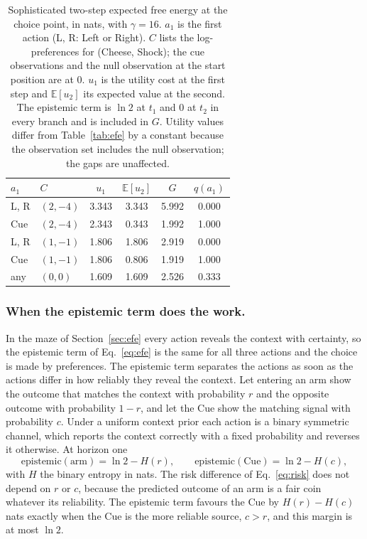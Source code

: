 \documentclass[pdflatex,sn-apa]{sn-jnl}%
\theoremstyle{definition}
\providecommand{\E}{\mathbb{E}}
\begin{document}
\begin{table}[t]
\centering
{\small
\begin{tabular}{llcccc}
\hline
$a_1$ & $C$ & $u_1$ & $\E[u_2]$ & $G$ & $q(a_1)$ \\
\hline
L, R & $(2,-4)$ & 3.343 & 3.343 & 5.992 & 0.000 \\
Cue  & $(2,-4)$ & 2.343 & 0.343 & 1.992 & 1.000 \\
L, R & $(1,-1)$ & 1.806 & 1.806 & 2.919 & 0.000 \\
Cue  & $(1,-1)$ & 1.806 & 0.806 & 1.919 & 1.000 \\
any  & $(0,0)$  & 1.609 & 1.609 & 2.526 & 0.333 \\
\hline
\end{tabular}
}
\caption{Sophisticated two-step expected free energy at the choice point, in nats, with $\gamma = 16$. $a_1$ is the first action (L, R: Left or Right). $C$ lists the log-preferences for (Cheese, Shock); the cue observations and the null observation at the start position are at 0. $u_1$ is the utility cost at the first step and $\E[u_2]$ its expected value at the second. The epistemic term is $\ln 2$ at $t_1$ and 0 at $t_2$ in every branch and is included in $G$. Utility values differ from Table~\ref{tab:efe} by a constant because the observation set includes the null observation; the gaps are unaffected.}
\label{tab:efe2}
\end{table}

\subsubsection{When the epistemic term does the work.}\label{sec:noisyarm}
In the maze of Section~\ref{sec:efe} every action reveals the context with certainty, so the epistemic term of Eq.~\ref{eq:efe} is the same for all three actions and the choice is made by preferences. The epistemic term separates the actions as soon as the actions differ in how reliably they reveal the context. Let entering an arm show the outcome that matches the context with probability $r$ and the opposite outcome with probability $1-r$, and let the Cue show the matching signal with probability $c$. Under a uniform context prior each action is a binary symmetric channel, which reports the context correctly with a fixed probability and reverses it otherwise. At horizon one
\begin{equation}
\text{epistemic}(\text{arm}) = \ln 2 - H(r), \qquad \text{epistemic}(\text{Cue}) = \ln 2 - H(c),
\label{eq:noisyepist}
\end{equation}
with $H$ the binary entropy in nats. The risk difference of Eq.~\ref{eq:risk} does not depend on $r$ or $c$, because the predicted outcome of an arm is a fair coin whatever its reliability. The epistemic term favours the Cue by $H(r) - H(c)$ nats exactly when the Cue is the more reliable source, $c > r$, and this margin is at most $\ln 2$.
\end{document}
